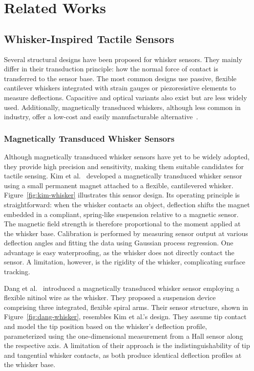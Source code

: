 

\chapter{Related Works}


\section{Whisker-Inspired Tactile Sensors}
Several structural designs have been proposed for whisker sensors.
They mainly differ in their transduction principle: how the normal force of contact is transferred to the sensor base.
The most common designs use passive, flexible cantilever whiskers integrated with strain gauges or piezoresistive elements to measure deflections.
Capacitive and optical variants also exist but are less widely used.
Additionally, magnetically transduced whiskers, although less common in industry, offer a low-cost and easily manufacturable alternative~\cite{8968518}.

\subsection{Magnetically Transduced Whisker Sensors}
Although magnetically transduced whisker sensors have yet to be widely adopted, they provide high precision and sensitivity, making them suitable candidates for tactile sensing.
Kim et al.~\cite{8968518} developed a magnetically transduced whisker sensor using a small permanent magnet attached to a flexible, cantilevered whisker.
Figure~\ref{fig:kim-whisker} illustrates this sensor design.
Its operating principle is straightforward: when the whisker contacts an object, deflection shifts the magnet embedded in a compliant, spring-like suspension relative to a magnetic sensor.
The magnetic field strength is therefore proportional to the moment applied at the whisker base.
Calibration is performed by measuring sensor output at various deflection angles and fitting the data using Gaussian process regression.
One advantage is easy waterproofing, as the whisker does not directly contact the sensor.
A limitation, however, is the rigidity of the whisker, complicating surface tracking.

Dang et al.~\cite{dang2025whisker} introduced a magnetically transduced whisker sensor employing a flexible nitinol wire as the whisker.
They proposed a suspension device comprising three integrated, flexible spiral arms.
Their sensor structure, shown in Figure~\ref{fig:dang-whisker}, resembles Kim et al.'s design.
They assume tip contact and model the tip position based on the whisker's deflection profile, parameterized using the one-dimensional measurement from a Hall sensor along the respective axis.
A limitation of their approach is the indistinguishability of tip and tangential whisker contacts, as both produce identical deflection profiles at the whisker base.

